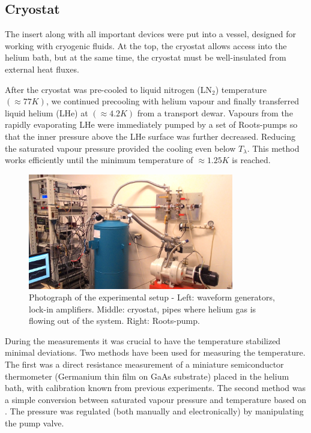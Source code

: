 \subsection*{Cryostat}


The insert along with all important devices were put into a vessel, designed for working with cryogenic fluids. At the top, the cryostat allows access into the helium bath, but at the same time, the cryostat must be well-insulated from external heat fluxes.

After the cryostat was pre-cooled to liquid nitrogen (LN$_2$) temperature $ (\approx 77\unit{K}) $, we continued precooling with helium vapour and finally transferred liquid helium (LHe) at $ (\approx 4.2\unit{K}) $ from a transport dewar. Vapours from the rapidly evaporating LHe were immediately pumped by a set of Roots-pumps so that the inner pressure above the LHe surface was further decreased. Reducing the saturated vapour pressure provided the cooling even below $ T_{\lambda} $. This method works efficiently until the minimum temperature of $ \approx 1.25\unit{K} $ is reached.


\begin{figure}[h]
	\centering
	\vspace{0.5cm}
	\includegraphics[width=0.8\textwidth]{graphics/apparatus}
	\caption{Photograph of the experimental setup - Left: waveform generators, lock-in amplifiers. Middle: cryostat, pipes where helium gas is flowing out of the system. Right: Roots-pump.}
\end{figure}

During the measurements it was crucial to have the temperature stabilized minimal deviations. Two methods have been used for measuring the temperature. The first was a direct resistance measurement of a miniature semiconductor thermometer (Germanium thin film on GaAs substrate) placed in the helium bath, with calibration known from previous experiments. The second method was a simple conversion between saturated vapour pressure and temperature based on \cite{donnelly}. The pressure was regulated (both manually and electronically) by manipulating the pump valve.

